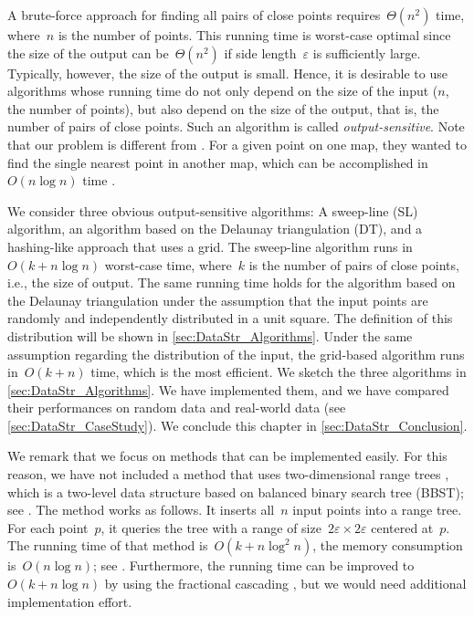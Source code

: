A brute-force approach for finding all pairs of close points 
requires~$\Theta (n^{2})$ time, 
where~$n$ is the number of points. 
This running time is worst-case optimal 
since the size of the output can be~$\Theta (n^{2})$ 
if side length~$\varepsilon$ is sufficiently large. 
Typically, however, the size of the output is small. 
Hence, it is desirable to use algorithms 
whose running time do not only depend on 
the size of the input ($n$, the number of points), 
but also depend on the size of the output, that is, 
the number of pairs of close points. 
Such an algorithm is called \emph{output-sensitive}. 
Note that our problem is different from \textcite{Saalfeld1988}. 
For a given point on one map, they wanted to find the 
single nearest point in another map,
which can be accomplished in~$O(n\log n)$ time 
\parencite{Shamos1975}.

We consider three obvious output-sensitive algorithms: 
A sweep-line (SL) algorithm, 
an algorithm based on the Delaunay triangulation (DT), and 
a hashing-like approach that uses a grid. 
The sweep-line algorithm runs in~$O(k+n\log n)$ worst-case time,
where~$k$ is the number of pairs of close points, 
i.e., the size of output.
The same running time holds for the algorithm 
based on the Delaunay triangulation
under the assumption that 
the input points are randomly and independently distributed 
in a unit square.
The definition of this distribution will be shown
in \sect\ref{sec:DataStr_Algorithms}. 
Under the same assumption 
regarding the distribution of the input, 
the grid-based algorithm runs in~$O(k+n)$ time,
which is the most efficient. 
We sketch the three algorithms in 
\sect\ref{sec:DataStr_Algorithms}. 
We have implemented them, and 
we have compared their performances on random data 
and real-world data (see \sect\ref{sec:DataStr_CaseStudy}). 
We conclude this chapter in \sect\ref{sec:DataStr_Conclusion}.



We remark that we focus on methods 
that can be implemented easily.
For this reason, we have not included a method that uses 
two-dimensional range trees
\parencite[e.g.,][]{Bentley1977Multivariate,Lueker1978,Lee1980Tree}, 
which is a two-level data structure based on
balanced binary search tree (BBST);
see \textcite[]{Cormen2009}.
The method works as follows. 
It inserts all~$n$ input points into a range tree.
For each point~$p$, it queries the tree
with a range of size~$2\varepsilon \times 2\varepsilon$ 
centered at~$p$.
The running time of that method is~$O(k+n\log ^{2}n)$, 
the memory consumption is~$O(n\log n)$;
see \textcite{Bentley1977Multivariate}. 
Furthermore, the running time can be improved to~$O(k+n\log n)$ 
by using the fractional cascading
\parencite[]{deBerg2008}, 
but we would need additional implementation effort.





